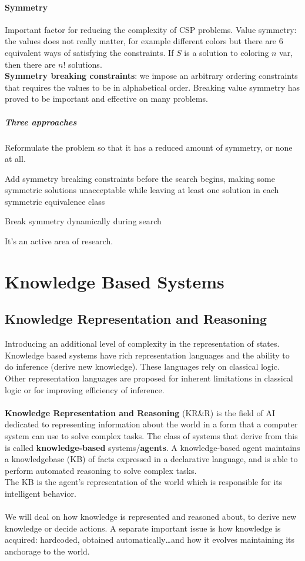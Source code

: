 \documentclass[10pt]{report}
\begin{document}
\paragraph{Symmetry} Important factor for reducing the complexity of CSP problems. Value symmetry: the values does not really matter, for example different colors but there are 6 equivalent ways of satisfying the constraints. If $S$ is a solution to coloring $n$ var, then there are $n!$ solutions.\\
\textbf{Symmetry breaking constraints}: we impose an arbitrary ordering constraints that requires the values to be in alphabetical order. Breaking value symmetry has proved to be important and effective on many problems.
\subparagraph{Three approaches}
\begin{list}{}{}
	\item Reformulate the problem so that it has a reduced amount of symmetry, or none at all.
	\item Add symmetry breaking constraints before the search begins, making some symmetric solutions unacceptable while leaving at least one solution in each symmetric equivalence class
	\item Break symmetry dynamically during search
\end{list}
It's an active area of research.
\section{Knowledge Based Systems}
\subsection{Knowledge Representation and Reasoning}
Introducing an additional level of complexity in the representation of states. Knowledge based systems have rich representation languages and the ability to do inference (derive new knowledge). These languages rely on classical logic.\\
Other representation languages are proposed for inherent limitations in classical logic or for improving efficiency of inference.\\\\
\textbf{Knowledge Representation and Reasoning} (KR\&R) is the field of AI dedicated to representing information about the world in a form that a computer system can use to solve complex tasks. The class of systems that derive from this is called \textbf{knowledge-based} systems/\textbf{agents}. A knowledge-based agent maintains a knowledgebase (KB) of facts expressed in a declarative language, and is able to perform automated reasoning to solve complex tasks.\\
The KB is the agent's representation of the world which is responsible for its intelligent behavior.\\\\
We will deal on how knowledge is represented and reasoned about, to derive new knowledge or decide actions. A separate important issue is how knowledge is acquired: hardcoded, obtained automatically\ldots and how it evolves maintaining its anchorage to the world.
\end{document}
